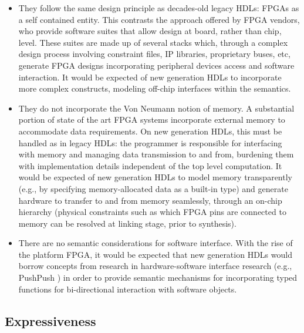 \begin{itemize}
	\item They follow the same design principle as decades-old legacy HDLs: FPGAs as a self contained entity. This contrasts the approach offered by FPGA vendors, who provide software suites that allow design at board, rather than chip, level. These suites are made up of several stacks which, through a complex design process involving constraint files, IP libraries, proprietary buses, etc, generate FPGA designs incorporating peripheral devices access and software interaction. It would be expected of new generation HDLs to incorporate more complex constructs, modeling off-chip interfaces within the semantics.
	\item They do not incorporate the Von Neumann notion of memory. A substantial portion of state of the art FPGA systems incorporate external memory to accommodate data requirements. On new generation HDLs, this must be handled as in legacy HDLs: the programmer is responsible for interfacing with memory and managing data transmission to and from, burdening them with implementation details independent of the top level computation. It would be expected of new generation HDLs to model memory transparently (e.g., by specifying memory-allocated data as a built-in type) and generate hardware to transfer to and from memory seamlessly, through an on-chip hierarchy (physical constraints such as which FPGA pins are connected to memory can be resolved at linking stage, prior to synthesis).  
	\item There are no semantic considerations for software interface. With the rise of the platform FPGA, it would be expected that new generation HDLs would borrow concepts from research in hardware-software interface research (e.g., PushPush \cite{7294024}) in order to provide semantic mechanisms for incorporating typed functions for bi-directional interaction with software objects. 
\end{itemize}



\subsection{Expressiveness}
	
